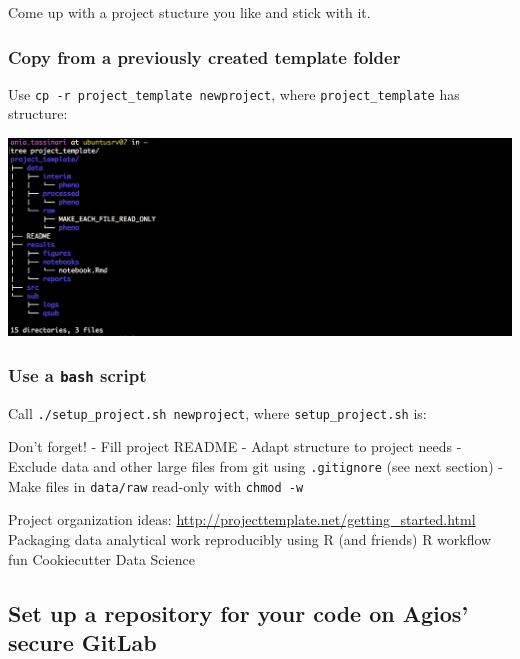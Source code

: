 \documentclass[]{book}
\begin{document}
Come up with a project stucture you like and stick with it.

\hypertarget{copy-from-a-previously-created-template-folder}{%
\subsubsection{Copy from a previously created template folder}\label{copy-from-a-previously-created-template-folder}}

Use \texttt{cp\ -r\ project\_template\ newproject}, where \texttt{project\_template} has structure:

\includegraphics[width=27.78in]{images/projectstructure}

\hypertarget{use-a-bash-script}{%
\subsubsection{\texorpdfstring{Use a \texttt{bash} script}{Use a bash script}}\label{use-a-bash-script}}

Call \texttt{./setup\_project.sh\ newproject}, where \texttt{setup\_project.sh} is:

Don't forget!
- Fill project README
- Adapt structure to project needs
- Exclude data and other large files from git using \texttt{.gitignore} (see next section)
- Make files in \texttt{data/raw} read-only with \texttt{chmod\ -w}

Project organization ideas:
\url{http://projecttemplate.net/getting_started.html}
Packaging data analytical work reproducibly using R (and friends)
R workflow fun
Cookiecutter Data Science

\hypertarget{set-up-a-repository-for-your-code-on-agios-secure-gitlab}{%
\subsection{Set up a repository for your code on Agios' secure GitLab}\label{set-up-a-repository-for-your-code-on-agios-secure-gitlab}}
\end{document}
